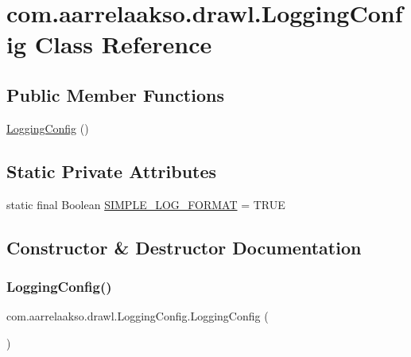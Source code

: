 \hypertarget{classcom_1_1aarrelaakso_1_1drawl_1_1_logging_config}{}\section{com.\+aarrelaakso.\+drawl.\+Logging\+Config Class Reference}
\label{classcom_1_1aarrelaakso_1_1drawl_1_1_logging_config}
\subsection*{Public Member Functions}
\begin{DoxyCompactItemize}
\item 
\hyperlink{classcom_1_1aarrelaakso_1_1drawl_1_1_logging_config_a5f20bbe782ebdc46865c3d38828672f1}{Logging\+Config} ()
\end{DoxyCompactItemize}
\subsection*{Static Private Attributes}
\begin{DoxyCompactItemize}
\item 
static final Boolean \hyperlink{classcom_1_1aarrelaakso_1_1drawl_1_1_logging_config_a1cfdfab19a9fd0f78da68dc8bcce3144}{S\+I\+M\+P\+L\+E\+\_\+\+L\+O\+G\+\_\+\+F\+O\+R\+M\+AT} = T\+R\+UE
\end{DoxyCompactItemize}


\subsection{Constructor \& Destructor Documentation}
\mbox{\label{classcom_1_1aarrelaakso_1_1drawl_1_1_logging_config_a5f20bbe782ebdc46865c3d38828672f1}} 
\subsubsection{\texorpdfstring{Logging\+Config()}{LoggingConfig()}}
{\footnotesize\ttfamily com.\+aarrelaakso.\+drawl.\+Logging\+Config.\+Logging\+Config (\begin{DoxyParamCaption}{ }\end{DoxyParamCaption})}



